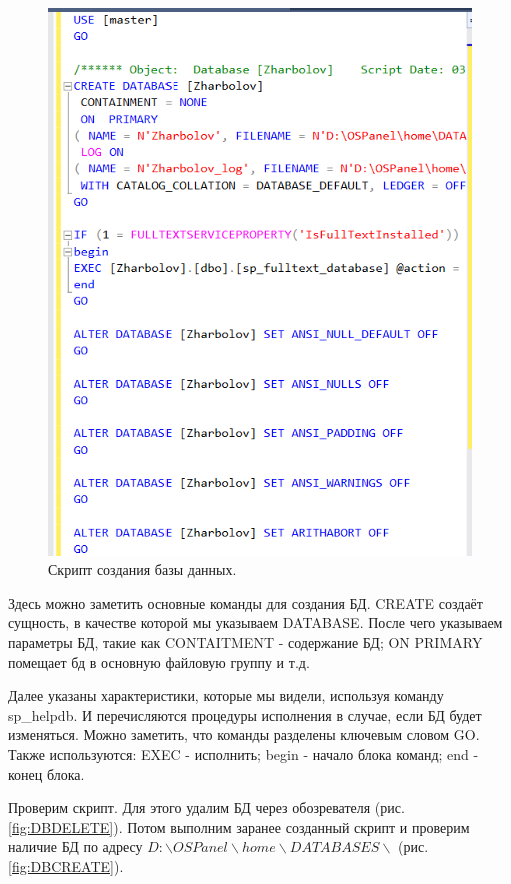 \begin{figure}[h!]
    \centering
    \includegraphics[width=0.5\linewidth]{Pic/lab1/SCRIPT.PNG}
    \caption{Скрипт создания базы данных.}
    \label{fig:SCRIPTCREATEBD}
\end{figure}

Здесь можно заметить основные команды для создания БД. CREATE создаёт сущность, в качестве которой мы указываем DATABASE. После чего указываем параметры БД, такие как CONTAITMENT - содержание БД; ON PRIMARY помещает бд в основную файловую группу и т.д. 

Далее указаны характеристики, которые мы видели, используя команду sp\_helpdb. И перечисляются процедуры исполнения в случае, если БД будет изменяться. Можно заметить, что команды разделены ключевым словом GO. Также используются: EXEC - исполнить; begin - начало блока команд; end - конец блока. 

Проверим скрипт. Для этого удалим БД через обозревателя (рис. \ref{fig:DBDELETE}). Потом выполним заранее созданный скрипт и проверим наличие БД по адресу $D:\backslash OSPanel\backslash home\backslash DATABASES\backslash $ (рис. \ref{fig:DBCREATE}).

